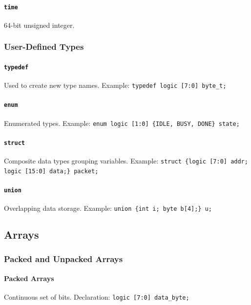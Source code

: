 \paragraph{\texttt{time}} 64-bit unsigned integer.

\subsubsection{User-Defined Types}
\paragraph{\texttt{typedef}} Used to create new type names. Example: \texttt{typedef logic [7:0] byte\_t;}

\paragraph{\texttt{enum}} Enumerated types. Example: \texttt{enum logic [1:0] \{IDLE, BUSY, DONE\} state;}

\paragraph{\texttt{struct}} Composite data types grouping variables. Example: \texttt{struct \{logic [7:0] addr; logic [15:0] data;\} packet;}

\paragraph{\texttt{union}} Overlapping data storage. Example: \texttt{union \{int i; byte b[4];\} u;}

\subsection{Arrays}
\subsubsection{Packed and Unpacked Arrays}

\paragraph{\textbf{Packed Arrays}} Continuous set of bits. Declaration: \texttt{logic [7:0] data\_byte;}

